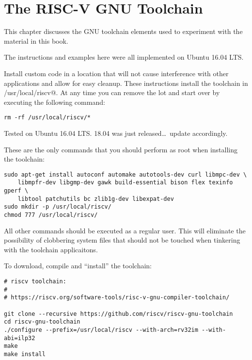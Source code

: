 \chapter{The RISC-V GNU Toolchain}

This chapter discusses the GNU toolchain elements used to
experiment with the material in this book.

The
instructions and examples here were all implemented on Ubuntu 16.04 LTS. 

Install custom code in a location that will not cause interference with
other applications and allow for easy cleanup.  These instructions 
install the toolchain in \verb@/usr/local/riscv@.  At any time
you can remove the lot and start over by executing the following 
command:

\begin{verbatim}
rm -rf /usr/local/riscv/*
\end{verbatim}


Tested on Ubuntu 16.04 LTS.   
18.04 was just released\ldots\ update accordingly.

These are the only commands that you should perform as root when installing
the toolchain:

\begin{verbatim}
sudo apt-get install autoconf automake autotools-dev curl libmpc-dev \
	libmpfr-dev libgmp-dev gawk build-essential bison flex texinfo gperf \
	libtool patchutils bc zlib1g-dev libexpat-dev
sudo mkdir -p /usr/local/riscv/
chmod 777 /usr/local/riscv/ 
\end{verbatim}

All other commands should be executed as a regular user.  This will eliminate the
possibility of clobbering system files that should not be touched when tinkering with
the toolchain applicaitons.

To download, compile and ``install'' the toolchain:

\begin{verbatim}
# riscv toolchain:
# 
# https://riscv.org/software-tools/risc-v-gnu-compiler-toolchain/

git clone --recursive https://github.com/riscv/riscv-gnu-toolchain
cd riscv-gnu-toolchain
./configure --prefix=/usr/local/riscv --with-arch=rv32im --with-abi=ilp32
make
make install
\end{verbatim}

